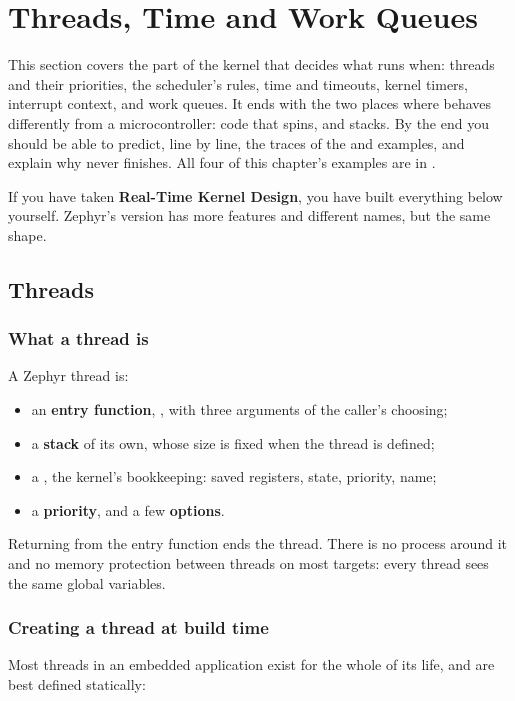 
\section{Threads, Time and Work Queues}
\label{c3:sec:threadstimeandwork}\label{c3:app:a}
This section covers the part of the kernel that decides what runs when: threads and their
priorities, the scheduler’s rules, time and timeouts, kernel timers, interrupt context, and work
queues. It ends with the two places where  behaves differently from a
microcontroller: code that spins, and stacks. By the end you should be able to predict, line by
line, the traces of the  and  examples, and explain why
 never finishes. All four of this chapter's examples are in
.

If you have taken \textbf{Real-Time Kernel Design}, you have built everything below yourself.
Zephyr’s version has more features and different names, but the same shape.

\subsection{Threads}

\subsubsection{What a thread is}
A Zephyr thread is:

\begin{itemize}
  \item an \textbf{entry function}, , with three arguments of
    the caller’s choosing;
  \item a \textbf{stack} of its own, whose size is fixed when the thread is defined;
  \item a \textbf{}, the kernel’s bookkeeping: saved registers, state, priority, name;
  \item a \textbf{priority}, and a few \textbf{options}.
\end{itemize}

Returning from the entry function ends the thread. There is no process around it and no memory
protection between threads on most targets: every thread sees the same global variables.

\subsubsection{Creating a thread at build time}
Most threads in an embedded application exist for the whole of its life, and are best defined
statically:

